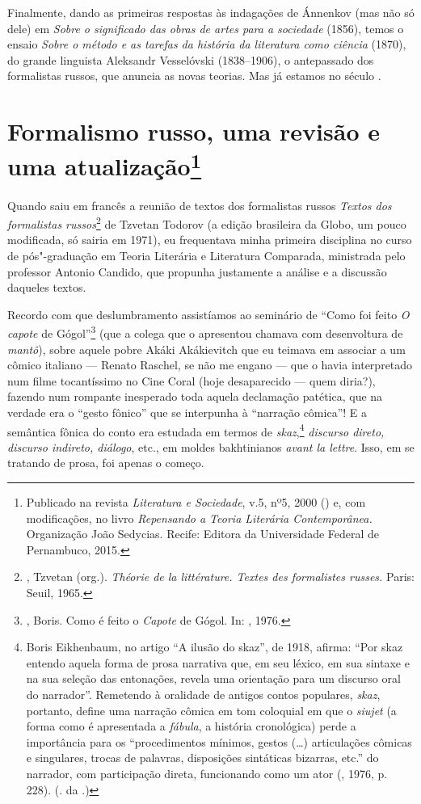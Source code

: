 Finalmente, dando as primeiras respostas às indagações de Ánnenkov (mas
não só dele) em \emph{Sobre o significado das obras de artes para a sociedade}
(1856), temos o ensaio \emph{Sobre o método e as tarefas da história da
literatura como ciência} (1870), do grande linguista Aleksandr
Vesselóvski (1838--1906), o antepassado dos formalistas russos, que anuncia as novas
teorias. Mas já estamos no século .

\chapter{Formalismo russo, uma revisão e uma atualização\footnote{Publicado na revista \emph{Literatura e Sociedade}, v.5, nº5, 2000 ({}) e, com modificações, no livro \emph{Repensando a Teoria Literária Contemporânea.} Organização João Sedycias. Recife: Editora da Universidade Federal de Pernambuco, 2015.}}

Quando saiu em francês a reunião de textos dos formalistas russos \emph{Textos dos formalistas
russos}\footnote{, 
Tzvetan (org.). \emph{Théorie de la littérature. Textes des 
formalistes russes.} Paris: Seuil, 1965.} de Tzvetan Todorov
(a edição brasileira da Globo, um pouco modificada, só sairia em 1971),
eu frequentava minha primeira disciplina no curso de pós"-graduação em Teoria Literária
e Literatura Comparada, ministrada pelo professor Antonio Candido, que propunha
justamente a análise e a discussão daqueles textos.


 Recordo com que deslumbramento assistíamos ao seminário de
``Como foi feito \emph{O capote} de Gógol''\footnote{, Boris.
 Como é feito o \emph{Capote} de Gógol. In: , 1976.} (que a colega que o
apresentou chamava com desenvoltura de \emph{mantô}), sobre aquele pobre Akáki
Akákievitch que eu teimava em associar a um cômico italiano --- Renato
Raschel, se não me engano --- que o havia interpretado num filme
tocantíssimo no Cine Coral (hoje desaparecido --- quem diria?), fazendo num rompante inesperado toda aquela declamação patética, que na
verdade era o ``gesto fônico'' que se interpunha à ``narração cômica''!
E a semântica fônica do conto era estudada em termos de \emph{skaz},\footnote{Boris Eikhenbaum, no artigo “A ilusão do skaz”,
 de 1918, afirma: ``Por skaz entendo aquela forma de prosa narrativa
 que, em seu léxico, em sua sintaxe e na sua seleção das entonações,
 revela uma orientação para um discurso oral do narrador''. Remetendo
 à oralidade de antigos contos populares, \emph{skaz}, portanto, 
define uma narração cômica em tom coloquial em que o \emph{siujet}
 (a forma como é apresentada a \emph{fábula}, a história cronológica)
 perde a importância para os ``procedimentos mínimos, gestos
 (\ldots{}) articulações cômicas e singulares, trocas de palavras,
 disposições sintáticas bizarras, etc.'' do narrador, com participação 
direta, funcionando como um ator (, 1976, p. 228).
 (. da .)}
\emph{discurso direto, discurso indireto, diálogo}, etc., em moldes bakhtinianos
\emph{avant la lettre}. Isso, em se tratando de prosa, foi apenas o começo.


